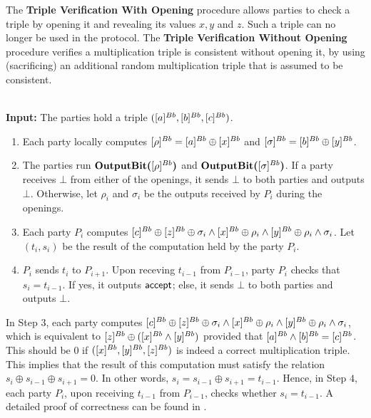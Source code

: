 The {\bf Triple Verification With Opening} procedure allows parties to check a triple by opening it and revealing its values $x, y$ and $z$.
Such a triple can no longer be used in the protocol.
The {\bf Triple Verification Without Opening} procedure verifies a multiplication triple is consistent without opening it, by using (sacrificing) an additional random multiplication triple that is assumed to be consistent.

\begin{protocol}
    \label{protocol:trip_without_open}
    \\
    {\bf Input:} The parties hold a triple $([a]^{Bb}, [b]^{Bb}, [c]^{Bb})$.
    \begin{enumerate}
        \item Each party locally computes $[\rho]^{Bb} = [a]^{Bb} \oplus [x]^{Bb}$ and $[\sigma]^{Bb} = [b]^{Bb} \oplus [y]^{Bb}$.
        \item The parties run $\textbf{OutputBit(}[\rho]^{Bb}\textbf{)}$ and $\textbf{OutputBit(}[\sigma]^{Bb}\textbf{)}$.
        If a party receives $\bot$ from either of the openings, it sends $\bot$ to both parties and outputs $\bot$.
        Otherwise, let $\rho_i$ and $\sigma_i$ be the outputs received by $P_i$ during the openings.
        \item Each party $P_i$ computes $[c]^{Bb} \oplus [z]^{Bb} \oplus \sigma_i \wedge [x]^{Bb} \oplus \rho_i \wedge [y]^{Bb} \oplus \rho_i \wedge \sigma_i$. Let $(t_i, s_i)$ be the result of the computation held by the party $P_i$.
        \item $P_i$ sends $t_i$ to $P_{i + 1}$. Upon receving $t_{i - 1}$ from $P_{i - 1}$, party $P_i$ checks that $s_i = t_{i - 1}$. If yes, it outputs $\mathsf{accept}$; else, it sends $\bot$ to both parties and outputs $\bot$.
    \end{enumerate}
\end{protocol}

In Step $3$, each party computes $[c]^{Bb} \oplus [z]^{Bb} \oplus \sigma_i \wedge [x]^{Bb} \oplus \rho_i \wedge [y]^{Bb} \oplus \rho_i \wedge \sigma_i$, which is equivalent to $[z]^{Bb} \oplus ([x]^{Bb} \wedge [y]^{Bb})$ provided that $[a]^{Bb} \wedge [b]^{Bb} = [c]^{Bb}$.
This should be $0$ if $([x]^{Bb}, [y]^{Bb}, [z]^{Bb})$ is indeed a correct multiplication triple.
This implies that the result of this computation must satisfy the relation $s_i \oplus s_{i - 1} \oplus s_{i + 1} = 0$. In other words, $s_i =  s_{i - 1} \oplus s_{i + 1} = t_{i - 1}$.
Hence, in Step $4$, each party $P_i$, upon receiving $t_{i - 1}$ from $P_{i - 1}$, checks whether $s_i = t_{i - 1}$. A detailed proof of correctness can be found in \cite{EC:FLNW17}. \\


